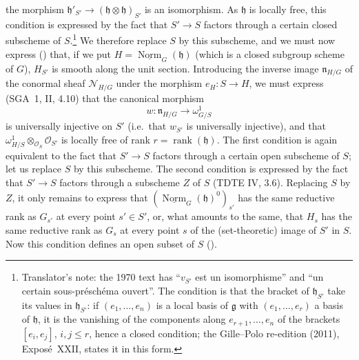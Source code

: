 the morphism \(\mathfrak h'_{S'}\to(\mathfrak h\otimes\mathfrak h)_{S'}\)
is an isomorphism. As \(\mathfrak h\) is locally free, this condition is
expressed by the fact that \(S'\to S\) factors through a certain closed
subscheme of \(S\).\footnote{Translator's note: the 1970 text has
``\(v_{S'}\) est un isomorphisme'' and ``un certain sous-préschéma ouvert''.
The condition is that the bracket of \(\mathfrak h_{S'}\) take its values in
\(\mathfrak h_{S'}\): if \((e_1,\ldots,e_n)\) is a local basis of
\(\mathfrak g\) with \((e_1,\ldots,e_r)\) a basis of \(\mathfrak h\), it is the
vanishing of the components along \(e_{r+1},\ldots,e_n\) of the brackets
\([e_i,e_j]\), \(i,j\leq r\), hence a closed condition; the Gille--Polo
re-edition (2011), Exposé~XXII, states it in this form.} We therefore replace \(S\) by this subscheme, and we
must now express \textup{()} that, if we put
\(H=\underline{\operatorname{Norm}}_G(\mathfrak h)\) \textup{(which is a
closed subgroup scheme of \(G\))}, \(H_{S'}\) is smooth along the unit
section. Introducing the inverse image \(\mathfrak n_{H/G}\) of the
conormal sheaf \(\mathcal N_{H/G}\) under the morphism
\(e_H\colon S\to H\), we must express \textup{(SGA~1, II, 4.10)} that the
canonical morphism
\[
  w\colon\mathfrak n_{H/G}\longrightarrow\omega^1_{G/S}
\]
is universally injective on \(S'\) \textup{(i.e.\ that \(w_{S'}\) is
universally injective)}, and that
\(\omega^1_{H/S}\otimes_{\mathcal O_S}\mathcal O_{S'}\) is locally free of
rank \(r=\operatorname{rank}(\mathfrak h)\). The first condition is again
equivalent to the fact that \(S'\to S\) factors through a certain open
subscheme of \(S\); let us replace \(S\) by this subscheme. The second
condition is expressed by the fact that \(S'\to S\) factors through a
subscheme \(Z\) of \(S\) \textup{(TDTE IV, 3.6)}. Replacing \(S\) by \(Z\),
it only remains to express that
\((\underline{\operatorname{Norm}}_G(\mathfrak h)^0)_{s'}\) has the same
reductive rank as \(G_{s'}\) at every point \(s'\in S'\), or, what amounts to
the same, that \(H_s\) has the same reductive rank as \(G_s\) at every point
\(s\) of the \textup{(set-theoretic)} image of \(S'\) in \(S\). Now this
condition defines an open subset of \(S\)
\textup{()}.

